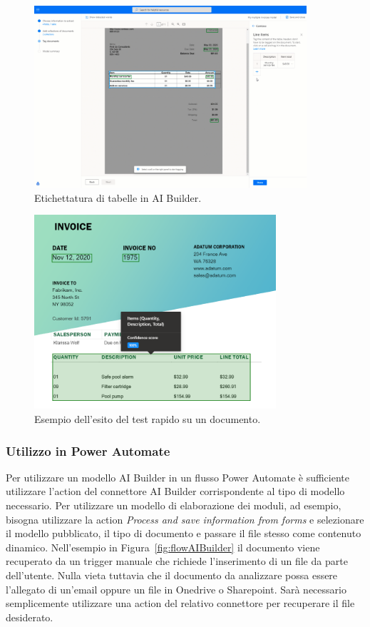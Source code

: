 \begin{figure}[ht]
  \centering
  \includegraphics[width=0.9\textwidth]{ai-builder-tables.png}
  \caption{Etichettatura di tabelle in AI Builder.}
  \label{fig:aiBuilderTables}
\end{figure}

\begin{figure}[ht!]
  \centering
  \includegraphics[width=0.8\textwidth]{ai-builder-test.png}
  \caption{Esempio dell'esito del test rapido su un documento.}
  \label{fig:aiBuilderTest}
\end{figure}

\subsubsection{Utilizzo in Power Automate}
Per utilizzare un modello AI Builder in un flusso Power Automate è sufficiente utilizzare l'action  del connettore AI Builder corrispondente al tipo di modello necessario. Per utilizzare un modello di elaborazione dei moduli, ad esempio, bisogna utilizzare la action \textit{Process and save information from forms} e selezionare il modello pubblicato, il tipo di documento e passare il file stesso come contenuto dinamico. Nell'esempio in Figura~\ref{fig:flowAIBuilder} il documento viene recuperato da un trigger manuale che richiede l'inserimento di un file da parte dell'utente. Nulla vieta tuttavia che il documento da analizzare possa essere l'allegato di un'email oppure un file in Onedrive o Sharepoint. Sarà necessario semplicemente utilizzare una action del relativo connettore per recuperare il file desiderato.

